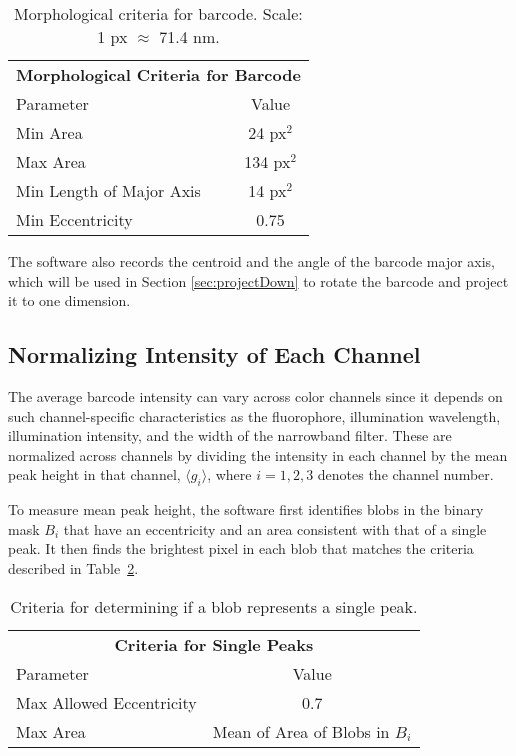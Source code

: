 \begin{table}[htbp] 
\begin{center}
\begin{tabular}{l c}
\multicolumn{2}{c}{\textbf{Morphological Criteria for Barcode}}\\
Parameter & Value \\
\hline
Min Area & 24 px$^2$ \\
Max Area & 134 px$^2$ \\
Min Length of Major Axis  & 14 px$^2$ \\
Min Eccentricity &0.75\\
\hline
\end{tabular}
\end{center}
\caption{Morphological criteria for barcode. Scale: 1 px $\approx$ 71.4 nm.\label{table:morphCriteria}}
\end{table}
The software also records the centroid and the angle of the barcode major axis, which will be used in Section \ref{sec:projectDown} to rotate the barcode and project it to one dimension. 

\subsection{Normalizing Intensity of Each Channel}\label{sec:normalizePeakHeight}
The average barcode intensity can vary across color channels since it depends on such channel-specific characteristics as the fluorophore, illumination wavelength, illumination intensity, and the width of the narrowband filter. These are normalized across channels by dividing the intensity in each channel by the mean peak height in that channel,  $\langle g_i \rangle$, where $i=1,2,3$ denotes the channel number. 

To measure mean peak height, the software first identifies blobs in the binary mask $B_i$ that have an eccentricity and an area consistent with that of a single peak. It then finds the brightest pixel in each blob that matches the criteria described in Table~\ref{table:singlePeak}.

\begin{table}[htbp] 	
\begin{center}
\begin{tabular}{l c}
\multicolumn{2}{c}{\textbf{Criteria for Single Peaks}}\\
Parameter & Value \\
\hline
Max Allowed Eccentricity  & 0.7 \\
Max Area &  Mean of Area of Blobs in $B_i$ \\
\hline
\end{tabular}
\caption{Criteria for determining if a blob represents a single peak. \label{table:singlePeak}}
\end{center}
\end{table}

